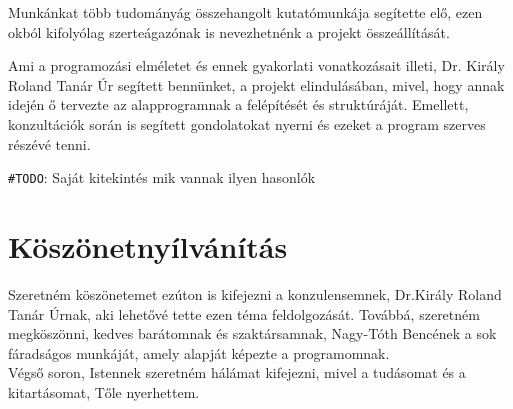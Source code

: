\documentclass[tocnopagenum]{thesis-ekf}
\theoremstyle{definition}
\theoremstyle{remark}
\begin{document}
	Munkánkat több tudományág összehangolt kutatómunkája segítette elő, ezen okból kifolyólag szerteágazónak is nevezhetnénk a projekt összeállítását.
	
	Ami a programozási elméletet és ennek gyakorlati vonatkozásait illeti, Dr. Király Roland Tanár Úr segített bennünket, a projekt elindulásában, mivel, hogy annak idején ő tervezte az alapprogramnak a felépítését és struktúráját. Emellett, konzultációk során is segített gondolatokat nyerni és ezeket a program szerves részévé tenni.

\verb*|#TODO|: Saját kitekintés mik vannak ilyen hasonlók
	

	\chapter*{Köszönetnyílvánítás}
	Szeretném köszönetemet ezúton is kifejezni a konzulensemnek, Dr.Király Roland Tanár Úrnak, aki lehetővé tette ezen téma feldolgozását.
	Továbbá, szeretném megköszönni, kedves barátomnak és szaktársamnak, Nagy-Tóth Bencének a sok fáradságos munkáját, amely alapját képezte a programomnak. 
	\\
	Végső soron, Istennek szeretném hálámat kifejezni, mivel a tudásomat és a kitartásomat, Tőle nyerhettem. 
	

	

	
	

	\listoffigures
\end{document}
